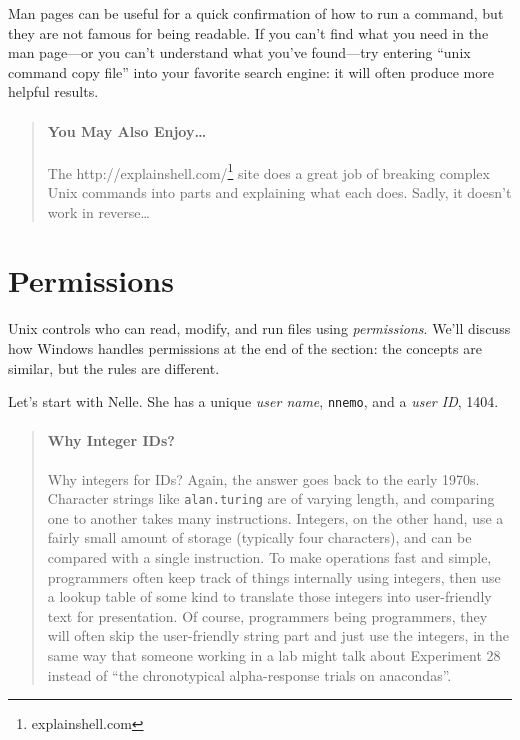 \documentclass[]{book}
\newcommand{\urlfoot}[2]{{#1}\footnote{#2}}
\newcommand{\gdef}[2]{\emph{#2}}
\begin{document}
Man pages can be useful for a quick confirmation of how to run a
command, but they are not famous for being readable. If you can't find
what you need in the man page---or you can't understand what you've
found---try entering ``unix command copy file'' into your favorite
search engine: it will often produce more helpful results.

\begin{quote}
\mbox{}\paragraph{You May Also Enjoy\ldots{}}

The \urlfoot{http://explainshell.com/}{explainshell.com} site does a great
job of breaking complex Unix commands into parts and explaining what
each does. Sadly, it doesn't work in reverse\ldots{}
\end{quote}

\section{Permissions}

Unix controls who can read, modify, and run files using
\emph{permissions}. We'll discuss how Windows handles permissions at the
end of the section: the concepts are similar, but the rules are
different.

Let's start with Nelle. She has a unique \gdef{g:user-name}{user
name}, \texttt{nnemo}, and a \gdef{g:user-id}{user ID}, 1404.

\begin{quote}
\mbox{}\paragraph{Why Integer IDs?}

Why integers for IDs? Again, the answer goes back to the early 1970s.
Character strings like \texttt{alan.turing} are of varying length, and
comparing one to another takes many instructions. Integers, on the other
hand, use a fairly small amount of storage (typically four characters),
and can be compared with a single instruction. To make operations fast
and simple, programmers often keep track of things internally using
integers, then use a lookup table of some kind to translate those
integers into user-friendly text for presentation. Of course,
programmers being programmers, they will often skip the user-friendly
string part and just use the integers, in the same way that someone
working in a lab might talk about Experiment 28 instead of ``the
chronotypical alpha-response trials on anacondas''.
\end{quote}
\end{document}
